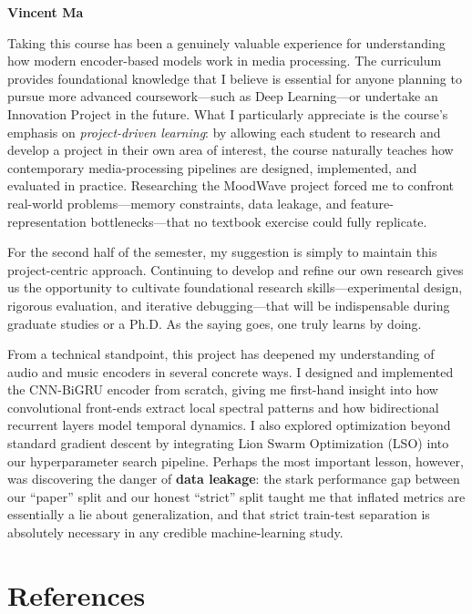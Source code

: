 \documentclass[12pt,a4paper]{article}
\begin{document}
\textbf{Vincent Ma}

Taking this course has been a genuinely valuable experience for understanding how modern encoder-based models work in media processing. The curriculum provides foundational knowledge that I believe is essential for anyone planning to pursue more advanced coursework---such as Deep Learning---or undertake an Innovation Project in the future. What I particularly appreciate is the course's emphasis on \textit{project-driven learning}: by allowing each student to research and develop a project in their own area of interest, the course naturally teaches how contemporary media-processing pipelines are designed, implemented, and evaluated in practice. Researching the MoodWave project forced me to confront real-world problems---memory constraints, data leakage, and feature-representation bottlenecks---that no textbook exercise could fully replicate.

For the second half of the semester, my suggestion is simply to maintain this project-centric approach. Continuing to develop and refine our own research gives us the opportunity to cultivate foundational research skills---experimental design, rigorous evaluation, and iterative debugging---that will be indispensable during graduate studies or a Ph.D. As the saying goes, one truly learns by doing.

From a technical standpoint, this project has deepened my understanding of audio and music encoders in several concrete ways. I designed and implemented the CNN-BiGRU encoder from scratch, giving me first-hand insight into how convolutional front-ends extract local spectral patterns and how bidirectional recurrent layers model temporal dynamics. I also explored optimization beyond standard gradient descent by integrating Lion Swarm Optimization (LSO) into our hyperparameter search pipeline. Perhaps the most important lesson, however, was discovering the danger of \textbf{data leakage}: the stark performance gap between our ``paper'' split and our honest ``strict'' split taught me that inflated metrics are essentially a lie about generalization, and that strict train-test separation is absolutely necessary in any credible machine-learning study.

\section*{References}
\end{document}
